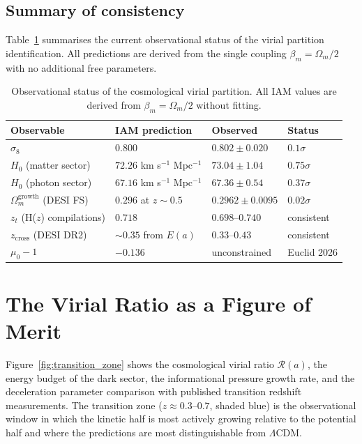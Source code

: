 \documentclass[12pt,a4paper]{article}
\begin{document}
\subsection{Summary of consistency}

Table~\ref{tab:evidence} summarises the current observational status of the
virial partition identification. All predictions are derived from the single
coupling $\beta_m = \Omega_m/2$ with no additional free parameters.

\begin{table}[h]
\centering
\caption{Observational status of the cosmological virial partition. All IAM
values are derived from $\beta_m = \Omega_m/2$ without fitting.}
\label{tab:evidence}
\begin{tabular}{p{4.2cm} p{3.2cm} p{3.2cm} l}
\toprule
Observable & IAM prediction & Observed & Status \\
\midrule
$\sigma_8$ & $0.800$ & $0.802 \pm 0.020$ & $0.1\sigma$ \\
$H_0$ (matter sector) & $72.26$ km s$^{-1}$ Mpc$^{-1}$ & $73.04 \pm 1.04$ & $0.75\sigma$ \\
$H_0$ (photon sector) & $67.16$ km s$^{-1}$ Mpc$^{-1}$ & $67.36 \pm 0.54$ & $0.37\sigma$ \\
$\Omega_m^\mathrm{growth}$ (DESI FS) & $0.296$ at $z \sim 0.5$ & $0.2962 \pm 0.0095$ & $0.02\sigma$ \\
$z_t$ (H($z$) compilations) & $0.718$ & $0.698$--$0.740$ & consistent \\
$z_\mathrm{cross}$ (DESI DR2) & $\sim 0.35$ from $E(a)$ & $0.33$--$0.43$ & consistent \\
$\mu_0 - 1$ & $-0.136$ & unconstrained & Euclid 2026 \\
\bottomrule
\end{tabular}
\end{table}

\section{The Virial Ratio as a Figure of Merit}

Figure~\ref{fig:transition_zone} shows the cosmological virial ratio
$\mathcal{R}(a)$, the energy budget of the dark sector, the informational
pressure growth rate, and the deceleration parameter comparison with published
transition redshift measurements. The transition zone ($z \approx 0.3$--$0.7$,
shaded blue) is the observational window in which the kinetic half is most
actively growing relative to the potential half and where the predictions are
most distinguishable from $\Lambda$CDM.
\end{document}
